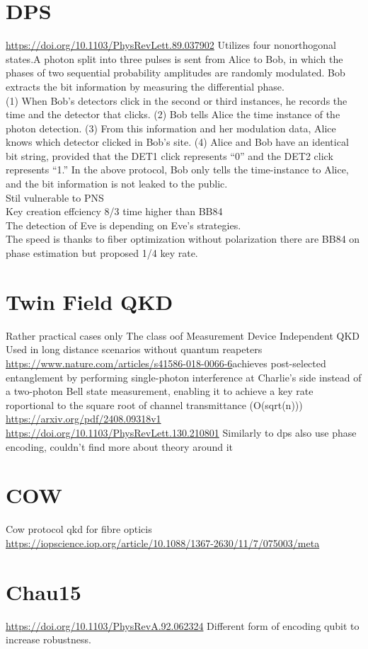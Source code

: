 \documentclass[12pt,a4paper]{article}
\begin{document}
\section{DPS}
\url{https://doi.org/10.1103/PhysRevLett.89.037902}
Utilizes four nonorthogonal states.A photon split into three pulses
is sent from Alice to Bob, in which the phases of two sequential probability amplitudes are randomly modulated. Bob extracts the bit information by measuring the differential phase. \\ 
(1) When Bob's detectors click in the second or third
instances, he records the time and the detector that clicks.
(2) Bob tells Alice the time instance of the photon detection. (3) From this information and her modulation data,
Alice knows which detector clicked in Bob’s site. (4) Alice and Bob have an identical bit string, provided that the
DET1 click represents “0” and the DET2 click represents
“1.” In the above protocol, Bob only tells the time-instance
to Alice, and the bit information is not leaked to the public. \\
Stil vulnerable to PNS \\ Key creation effciency 8/3 time higher than BB84 \\ The detection of Eve is depending on Eve's strategies. \\
The speed is thanks to fiber optimization without polarization there are BB84 on phase estimation but proposed 1/4 key rate.
\section{Twin Field QKD}
Rather practical cases only
The class oof Measurement Device Independent QKD
Used in long distance scenarios without quantum reapeters \url{https://www.nature.com/articles/s41586-018-0066-6}achieves post-selected entanglement by performing single-photon interference at Charlie’s side instead of a two-photon Bell state measurement, enabling it to achieve a key rate roportional to the square root of channel transmittance (O(sqrt(n))) \url{https://arxiv.org/pdf/2408.09318v1} \\ \url{https://doi.org/10.1103/PhysRevLett.130.210801} 
Similarly to dps also use phase encoding, couldn't find more about theory around it
\section{COW}
Cow protocol qkd for fibre opticis \url{https://iopscience.iop.org/article/10.1088/1367-2630/11/7/075003/meta}
\section{Chau15}
\url{https://doi.org/10.1103/PhysRevA.92.062324}
Different form of encoding qubit to increase robustness.
\end{document}

